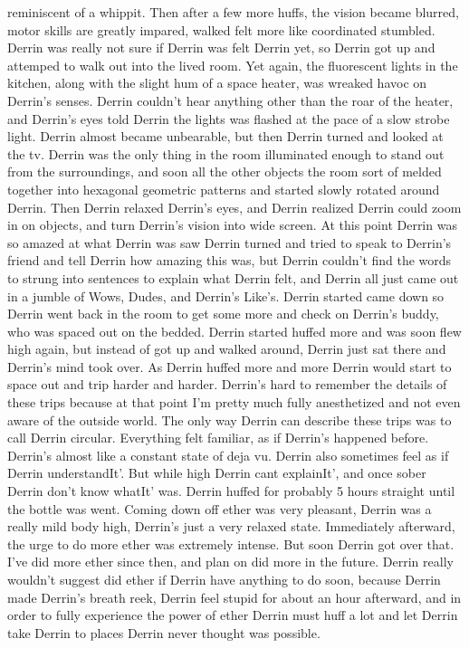 \documentclass[12pt]{book}
\begin{document}
reminiscent of a whippit. Then after a few more huffs, the vision became blurred, motor skills are greatly impared, walked felt more like coordinated stumbled. Derrin was really not sure if Derrin was felt Derrin yet, so Derrin got up and attemped to walk out into the lived room. Yet again, the fluorescent lights in the kitchen, along with the slight hum of a space heater, was wreaked havoc on Derrin's senses. Derrin couldn't hear anything other than the roar of the heater, and Derrin's eyes told Derrin the lights was flashed at the pace of a slow strobe light. Derrin almost became unbearable, but then Derrin turned and looked at the tv. Derrin was the only thing in the room illuminated enough to stand out from the surroundings, and soon all the other objects the room sort of melded together into hexagonal geometric patterns and started slowly rotated around Derrin. Then Derrin relaxed Derrin's eyes, and Derrin realized Derrin could zoom in on objects, and turn Derrin's vision into wide screen. At this point Derrin was so amazed at what Derrin was saw Derrin turned and tried to speak to Derrin's friend and tell Derrin how amazing this was, but Derrin couldn't find the words to strung into sentences to explain what Derrin felt, and Derrin all just came out in a jumble of Wows, Dudes, and Derrin's Like's. Derrin started came down so Derrin went back in the room to get some more and check on Derrin's buddy, who was spaced out on the bedded. Derrin started huffed more and was soon flew high again, but instead of got up and walked around, Derrin just sat there and Derrin's mind took over. As Derrin huffed more and more Derrin would start to space out and trip harder and harder. Derrin's hard to remember the details of these trips because at that point I'm pretty much fully anesthetized and not even aware of the outside world. The only way Derrin can describe these trips was to call Derrin circular. Everything felt familiar, as if Derrin's happened before. Derrin's almost like a constant state of deja vu. Derrin also sometimes feel as if Derrin understandIt'. But while high Derrin cant explainIt', and once sober Derrin don't know whatIt' was. Derrin huffed for probably 5 hours straight until the bottle was went. Coming down off ether was very pleasant, Derrin was a really mild body high, Derrin's just a very relaxed state. Immediately afterward, the urge to do more ether was extremely intense. But soon Derrin got over that. I've did more ether since then, and plan on did more in the future. Derrin really wouldn't suggest did ether if Derrin have anything to do soon, because Derrin made Derrin's breath reek, Derrin feel stupid for about an hour afterward, and in order to fully experience the power of ether Derrin must huff a lot and let Derrin take Derrin to places Derrin never thought was possible.
\end{document}
